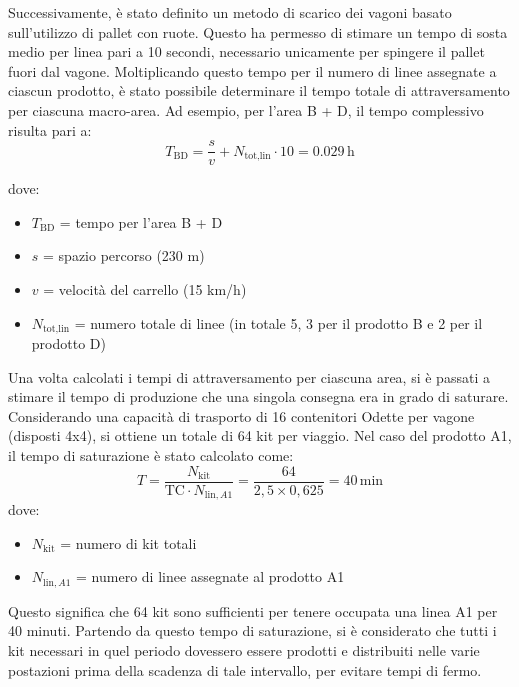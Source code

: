 \documentclass[11pt]{article}
\begin{document}
Successivamente, è stato definito un metodo di scarico dei vagoni basato sull'utilizzo di pallet con ruote. Questo ha permesso di stimare un tempo di sosta medio per linea pari a 10 secondi, necessario unicamente per spingere il pallet fuori dal vagone. Moltiplicando questo tempo per il numero di linee assegnate a ciascun prodotto, è stato possibile determinare il tempo totale di attraversamento per ciascuna macro-area. Ad esempio, per l’area B + D, il tempo complessivo risulta pari a:
\begin{equation}
    T_\text{BD} = \frac{s}{v} + N_\text{tot,lin} \cdot 10 = 0.029 \, \text{h}
\end{equation}

dove:
\begin{itemize}
    \item $T_\text{BD}$ = tempo per l'area B + D
    \item $s$ = spazio percorso (230 m)
    \item $v$ = velocità del carrello (15 km/h)
    \item $N_\text{tot,lin}$ = numero totale di linee (in totale 5, 3 per il prodotto B e 2 per il prodotto D)
\end{itemize}
\newpage

Una volta calcolati i tempi di attraversamento per ciascuna area, si è passati a stimare il tempo di produzione che una singola consegna era in grado di saturare. Considerando una capacità di trasporto di 16 contenitori Odette per vagone (disposti 4x4), si ottiene un totale di 64 kit per viaggio.
Nel caso del prodotto A1, il tempo di saturazione è stato calcolato come:
\begin{equation}
    T = \frac{N_\text{kit}}{\text{TC} \cdot N_{\text{lin},A1} } = \frac{64}{2{,}5 \times 0{,}625} = 40 \, \text{min}
\end{equation}
dove:
\begin{itemize}
    \item $N_\text{kit}$ = numero di kit totali
    \item $N_{\text{lin},A1}$ = numero di linee assegnate al prodotto A1
\end{itemize}

\noindent
Questo significa che 64 kit sono sufficienti per tenere occupata una linea A1 per 40 minuti. Partendo da questo tempo di saturazione, si è considerato che tutti i kit necessari in quel periodo dovessero essere prodotti e distribuiti nelle varie postazioni prima della scadenza di tale intervallo, per evitare tempi di fermo.
\end{document}
